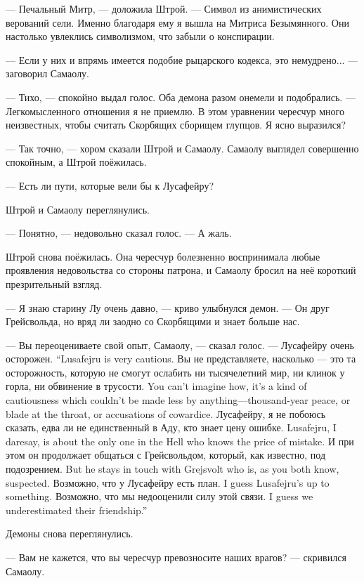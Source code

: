 --- Печальный Митр, --- доложила Штрой.
--- Символ из анимистических верований сели.
Именно благодаря ему я вышла на Митриса Безымянного.
Они настолько увлеклись символизмом, что забыли о конспирации.

--- Если у них и впрямь имеется подобие рыцарского кодекса, это немудрено... --- заговорил Самаолу.

--- Тихо, --- спокойно выдал голос.
Оба демона разом онемели и подобрались.
--- Легкомысленного отношения я не приемлю.
В этом уравнении чересчур много неизвестных, чтобы считать Скорбящих сборищем глупцов.
Я ясно выразился?

--- Так точно, --- хором сказали Штрой и Самаолу.
Самаолу выглядел совершенно спокойным, а Штрой поёжилась.

--- Есть ли пути, которые вели бы к Лусафейру?

Штрой и Самаолу переглянулись.

--- Понятно, --- недовольно сказал голос.
--- А жаль.

Штрой снова поёжилась.
Она чересчур болезненно воспринимала любые проявления недовольства со стороны патрона, и Самаолу бросил на неё короткий презрительный взгляд.

--- Я знаю старину Лу очень давно, --- криво улыбнулся демон.
--- Он друг Грейсвольда, но вряд ли заодно со Скорбящими и знает больше нас.

--- Вы переоцениваете свой опыт, Самаолу, --- сказал голос.
{--- Лусафейру очень осторожен.}
{``Lusafejru is very cautious.}
{Вы не представляете, насколько --- это та осторожность, которую не смогут ослабить ни тысячелетний мир, ни клинок у горла, ни обвинение в трусости.}
{You can't imagine how, it's a kind of cautiousness which couldn't be made less by anything---thousand-year peace, or blade at the throat, or accusations of cowardice.}
{Лусафейру, я не побоюсь сказать, едва ли не единственный в Аду, кто знает цену ошибке.}
{Lusafejru, I daresay, is about the only one in the Hell who knows the price of mistake.}
{И при этом он продолжает общаться с Грейсвольдом, который, как известно, под подозрением.}
{But he stays in touch with Grejsvolt who is, as you both know, suspected.}
{Возможно, что у Лусафейру есть план.}
{I guess Lusafejru's up to something.}
{Возможно, что мы недооценили силу этой связи.}
{I guess we underestimated their friendship.''}

Демоны снова переглянулись.

--- Вам не кажется, что вы чересчур превозносите наших врагов? --- скривился Самаолу.

